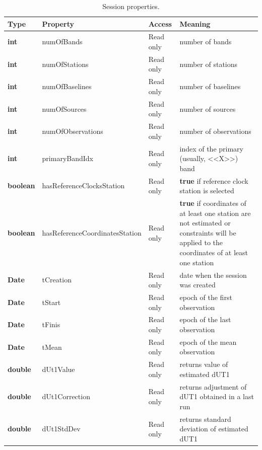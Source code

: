 \documentclass [10pt,letterpaper]{report}
\begin{document}
\begin{table}[htb]
\centering
\footnotesize
\begin{tabular}{lllp{}}
\hline
Type & Property & Access & Meaning\\
\hline
  {\bf int}     & numOfBands        & Read only & number of bands\\
  {\bf int}     & numOfStations     & Read only & number of stations\\
  {\bf int}     & numOfBaselines    & Read only & number of baselines\\
  {\bf int}     & numOfSources      & Read only & number of sources\\
  {\bf int}     & numOfObservations & Read only & number of observations\\
  {\bf int}     & primaryBandIdx    & Read only & index of the primary (usually, <<X>>) band\\

  {\bf boolean} & hasReferenceClocksStation      & Read only & {\bf true} if reference clock station is selected\\
  {\bf boolean} & hasReferenceCoordinatesStation & Read only & {\bf true} if coordinates of at least one station
are not estimated or constraints will be applied to the coordinates of at least one station\\

  {\bf Date}    & tCreation & Read only & date when the session was created\\
  {\bf Date}    & tStart    & Read only & epoch of the first observation\\
  {\bf Date}    & tFinis    & Read only & epoch of the last observation\\
  {\bf Date}    & tMean     & Read only & epoch of the mean observation\\
%
  {\bf double}  &  dUt1Value      & Read only & returns value of estimated dUT1\\
  {\bf double}  &  dUt1Correction & Read only & returns adjustment of dUT1 obtained in a last run\\
  {\bf double}  &  dUt1StdDev     & Read only & returns standard deviation of estimated dUT1\\
\hline
\end{tabular}
\caption{Session properties.}
\label{tab-scr-session-2}
\end{table}
\end{document}
